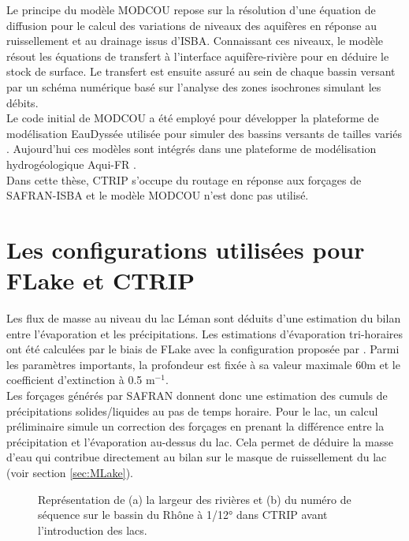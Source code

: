 Le principe du modèle MODCOU repose sur la résolution d'une équation de diffusion pour le calcul des variations de niveaux des aquifères en réponse au ruissellement et au drainage issus d'ISBA. Connaissant ces niveaux, le modèle résout les équations de transfert à l'interface aquifère-rivière pour en déduire le stock de surface. Le transfert est ensuite assuré au sein de chaque bassin versant par un schéma numérique basé sur l'analyse des zones isochrones simulant les débits.\\
Le code initial de MODCOU a été employé pour développer la plateforme de modélisation EauDyssée utilisée pour simuler des bassins versants de tailles variés \citep{saleh2011}. Aujourd'hui ces modèles sont intégrés dans une plateforme de modélisation hydrogéologique Aqui-FR \citep{vergnes2020}.\\
Dans cette thèse, CTRIP s'occupe du routage en réponse aux forçages de SAFRAN-ISBA et le modèle MODCOU n'est donc pas utilisé.
\section{{\selectfont Les configurations utilisées pour FLake et CTRIP}}
\label{sec:config_rhone}

Les flux de masse au niveau du lac Léman sont déduits d'une estimation du bilan entre l'évaporation et les précipitations. Les estimations d'évaporation tri-horaires ont été calculées par le biais de FLake avec la configuration proposée par \citet{lemoigne2016}. Parmi les paramètres importants, la profondeur est fixée à sa valeur maximale 60m et le coefficient d'extinction à 0.5 m$^{-1}$.\\
Les forçages générés par SAFRAN donnent donc une estimation des cumuls de précipitations solides/liquides au pas de temps horaire. Pour le lac, un calcul préliminaire simule un correction des forçages en prenant la différence entre la précipitation et l'évaporation au-dessus du lac. Cela permet de déduire la masse d'eau qui contribue directement au bilan sur le masque de ruissellement du lac (voir section \ref{sec:MLake}).\\

\begin{figure}[!h]
     \hfill
     \hfill
     \caption{Représentation de (a) la largeur des rivières et (b) du numéro de séquence sur le bassin du Rhône à 1/12° dans CTRIP avant l'introduction des lacs.}
     \label{param_ctrip}
\end{figure}


